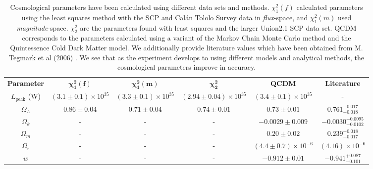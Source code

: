 \documentclass[twocolumn]{revtex4}
\begin{document}
{\renewcommand{\arraystretch}{1.2}%
\begin{table}[t]
\centering
\begin{tabular}{c@{\hskip 15pt}c@{\hskip 15pt}c@{\hskip 15pt}c@{\hskip 15pt}c@{\hskip 15pt}c} 
 \hline
 \textbf{Parameter} & \textbf{$\boldsymbol{\chi^2_{1}(f)}$} & \textbf{$\boldsymbol{\chi^2_{1}(m)}$} & \textbf{$\boldsymbol{\chi^2_2}$} & \textbf{QCDM} & \textbf{Literature} \\ [0.5ex] 
 $L_{\text{peak}}$ (W) & $(3.1\pm0.1)\times 10^{35}$ & $(3.3\pm0.1)\times 10^{35}$ & $(2.94\pm0.04)\times 10^{35}$ & $(3.4\pm0.1 ) \times 10^{35}$ & -\\
 $\Omega_\Lambda$ & $0.86\pm0.04$ &  $0.71\pm0.04$ & $0.74\pm0.01$ & $0.73\pm0.01$ & $0.761^{+0.017}_{-0.018}$ \\
 $\Omega_k$ & - & - & - & $-0.0029\pm0.009$ & $-0.0030^{+0.0095}_{-0.0102}$ \\
 $\Omega_m$ & - & - & - & $0.20\pm0.02$ & $0.239^{+0.018}_{-0.017}$ \\
 $\Omega_r$ & - & - & - & $(4.4\pm0.7)\times10^{-6}$ & $(4.16)\times10^{-6}$ \\
 $w$ & - & - & - & $-0.912\pm0.01$ & $-0.941^{+0.087}_{-0.101}$ \\
 \hline
\end{tabular}
\caption{Cosmological parameters have been calculated using different data sets and methods. $\chi^2_1(f)$ calculated parameters using the least squares method with the SCP and Cal\'{a}n Tololo Survey data in \textit{flux}-space, and $\chi^2_1(m)$ used \textit{magnitude}-space. $\chi^2_2$ are the parameters found with least squares and the larger Union2.1 SCP data set. QCDM corresponds to the parameters calculated using a variant of the Markov Chain Monte Carlo method and the Quintessence Cold Dark Matter model. We additionally provide literature values which have been obtained from M. Tegmark et al (2006) \cite{cosmo_constraints}. We see that as the experiment develops to using different models and analytical methods, the cosmological parameters improve in accuracy.}
\vspace{-1em}
\label{table:cosmo_parameters}
\end{table}

}
\end{document}
